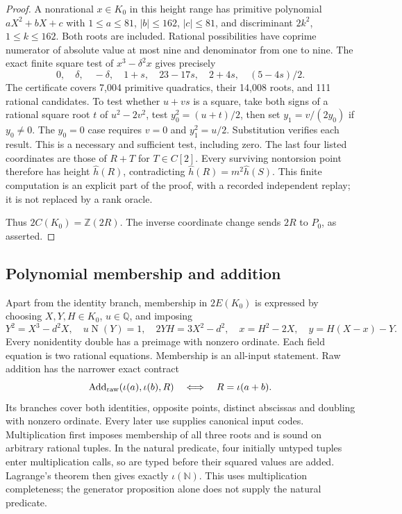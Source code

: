 \documentclass[11pt]{article}
\theoremstyle{definition}
\theoremstyle{remark}
\newcommand{\Q}{\mathbb Q}
\newcommand{\Z}{\mathbb Z}
\newcommand{\N}{\mathbb N}
\newcommand{\Norm}{\operatorname{N}}
\begin{document}
\begin{proof}
A nonrational $x\in K_0$ in this height range has primitive polynomial
$aX^2+bX+c$ with $1\le a\le81$, $|b|\le162$, $|c|\le81$, and
discriminant $2k^2$, $1\le k\le162$. Both roots are included.
Rational possibilities have coprime numerator of absolute value at most
nine and denominator from one to nine. The exact finite square test of
$x^3-\delta^2x$ gives precisely
\[
 0,\quad\delta,\quad-\delta,\quad1+s,\quad23-17s,
 \quad2+4s,\quad(5-4s)/2.
\]
The certificate covers 7,004 primitive quadratics, their 14,008 roots,
and 111 rational candidates. To test whether $u+vs$ is a square, take
both signs of a rational square root $t$ of $u^2-2v^2$, test
$y_0^2=(u+t)/2$, then set $y_1=v/(2y_0)$ if $y_0\ne0$.
The $y_0=0$ case requires $v=0$ and $y_1^2=u/2$. Substitution verifies
each result. This is a necessary and sufficient test, including zero.
The last four listed coordinates are those of $R+T$ for $T\in C[2]$.
Every surviving nontorsion point therefore has height $\widehat h(R)$,
contradicting $\widehat h(R)=m^2\widehat h(S)$. This finite computation
is an explicit part of the proof, with a recorded independent replay;
it is not replaced by a rank oracle.

Thus $2C(K_0)=\Z(2R)$. The inverse coordinate change sends $2R$ to
$P_0$, as asserted.
\end{proof}

\subsection{Polynomial membership and addition}
Apart from the identity branch, membership in $2E(K_0)$ is expressed by
choosing $X,Y,H\in K_0$, $u\in\Q$, and imposing
\[
 Y^2=X^3-d^2X,\quad u\Norm(Y)=1,\quad2YH=3X^2-d^2,
 \quad x=H^2-2X,\quad y=H(X-x)-Y.
\]
Every nonidentity double has a preimage with nonzero ordinate.
Each field equation is two rational equations. Membership is an all-input
statement. Raw addition has the narrower exact contract
\[
 \operatorname{Add}_{\rm raw}(\iota(a),\iota(b),R)
             \quad\Longleftrightarrow\quad R=\iota(a+b).
\]
Its branches cover both identities, opposite points, distinct abscissas
and doubling with nonzero ordinate. Every later use supplies canonical
input codes. Multiplication first imposes membership of all three roots
and is sound on arbitrary rational tuples. In the natural predicate,
four initially untyped tuples enter multiplication calls, so are typed
before their squared values are added. Lagrange's theorem then gives
exactly $\iota(\N)$. This uses multiplication completeness; the generator
proposition alone does not supply the natural predicate.
\end{document}
